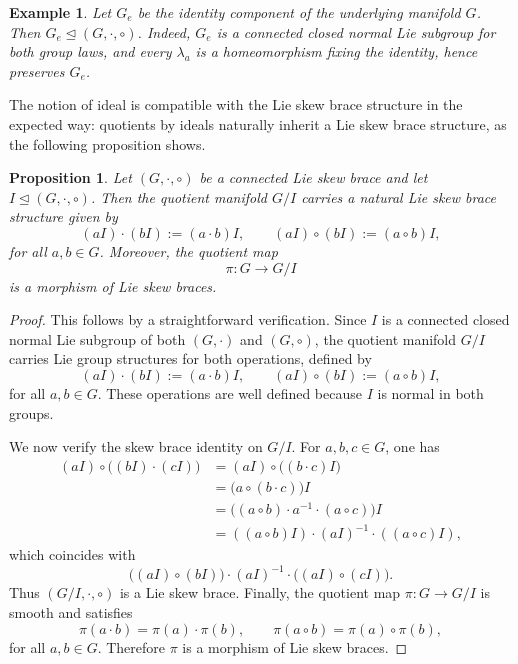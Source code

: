 \documentclass[reqno]{amsart}
\newtheorem{proposition}[theorem]{Proposition}
\newtheorem{example}[theorem]{Example}
\begin{document}
\begin{example}\rm
Let $G_e$ be the identity component of the underlying manifold $G$. Then
$G_e\trianglelefteq (G,\cdot,\circ)$.
Indeed, $G_e$ is a connected closed normal Lie subgroup for both group laws,
and every $\lambda_a$ is a homeomorphism fixing the identity, hence preserves
$G_e$.
\end{example}

The notion of ideal is compatible with the Lie skew brace structure in the
expected way: quotients by ideals naturally inherit a Lie skew brace
structure, as the following proposition shows.

\begin{proposition}\label{prop:quotient-LSB}
Let $(G,\cdot,\circ)$ be a connected Lie skew brace and let
$I\trianglelefteq (G,\cdot,\circ)$. Then the quotient manifold $G/I$ carries a
natural Lie skew brace structure given by
\[
(aI)\cdot (bI):=(a\cdot b)I,
\qquad
(aI)\circ (bI):=(a\circ b)I,
\]
for all $a,b\in G$. Moreover, the quotient map
\[
\pi:G\to G/I
\]
is a morphism of Lie skew braces.
\end{proposition}
\begin{proof}
This follows by a straightforward verification. Since \(I\) is a connected
closed normal Lie subgroup of both \((G,\cdot)\) and \((G,\circ)\), the quotient
manifold \(G/I\) carries Lie group structures for both operations, defined by
\[
(aI)\cdot (bI):=(a\cdot b)I,
\qquad
(aI)\circ (bI):=(a\circ b)I,
\]
for all \(a,b\in G\). These operations are well defined because \(I\) is normal
in both groups.

We now verify the skew brace identity on \(G/I\). For \(a,b,c\in G\), one has
\begin{align*}
(aI)\circ\bigl((bI)\cdot(cI)\bigr)
&=(aI)\circ\bigl((b\cdot c)I\bigr)\\
&=\bigl(a\circ (b\cdot c)\bigr)I\\
&=\bigl((a\circ b)\cdot a^{-1}\cdot (a\circ c)\bigr)I\\
&=((a\circ b)I)\cdot (aI)^{-1}\cdot ((a\circ c)I),
\end{align*}
which coincides with
\[
\bigl((aI)\circ (bI)\bigr)\cdot (aI)^{-1}\cdot \bigl((aI)\circ (cI)\bigr).
\]
Thus \((G/I,\cdot,\circ)\) is a Lie skew brace.
Finally, the quotient map \(\pi:G\to G/I\) is smooth and satisfies
\[
\pi(a\cdot b)=\pi(a)\cdot \pi(b),
\qquad
\pi(a\circ b)=\pi(a)\circ \pi(b),
\]
for all \(a,b\in G\). Therefore \(\pi\) is a morphism of Lie skew braces.
\end{proof}
%
\end{document}
